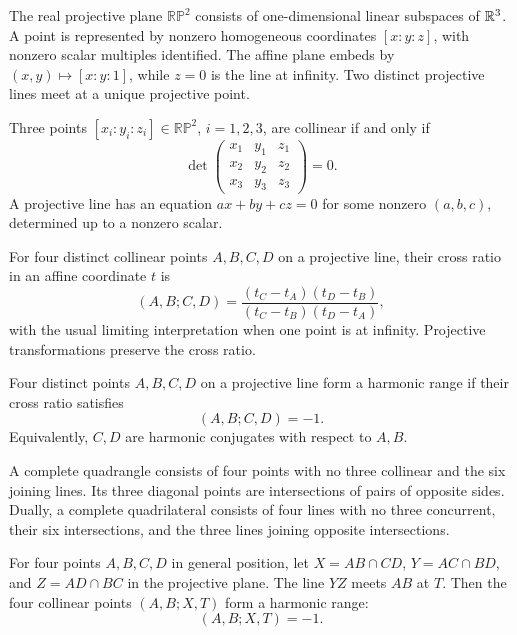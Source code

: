 \begin{definition}
The real projective plane $\mathbb{RP}^2$ consists of one-dimensional linear subspaces of $\mathbb{R}^3$. A point is represented by nonzero homogeneous coordinates $[x:y:z]$, with nonzero scalar multiples identified. The affine plane embeds by $(x,y)\mapsto[x:y:1]$, while $z=0$ is the line at infinity. Two distinct projective lines meet at a unique projective point.
\end{definition}
\begin{proposition}
Three points $[x_i:y_i:z_i]\in\mathbb{RP}^2$, $i=1,2,3$, are collinear if and only if
\[
 \det\begin{pmatrix}
 x_1&y_1&z_1\\ x_2&y_2&z_2\\ x_3&y_3&z_3
 \end{pmatrix}=0.
\]
A projective line has an equation $ax+by+cz=0$ for some nonzero $(a,b,c)$, determined up to a nonzero scalar.
\end{proposition}

\begin{definition}
For four distinct collinear points $A, B, C, D$ on a projective line, their cross ratio in an affine coordinate $t$ is
\[
 (A, B;C, D)=\frac{(t_C-t_A)(t_D-t_B)}{(t_C-t_B)(t_D-t_A)},
\]
with the usual limiting interpretation when one point is at infinity. Projective transformations preserve the cross ratio.
\end{definition}

\begin{definition}
Four distinct points $A,B,C,D$ on a projective line form a harmonic range if their cross ratio satisfies
\[
 (A,B;C,D)=-1.
\]
Equivalently, $C,D$ are harmonic conjugates with respect to $A,B$.
\end{definition}

\begin{definition}
A complete quadrangle consists of four points with no three collinear and the six joining lines. Its three diagonal points are intersections of pairs of opposite sides. Dually, a complete quadrilateral consists of four lines with no three concurrent, their six intersections, and the three lines joining opposite intersections.
\end{definition}

\begin{theorem}
For four points $A,B,C,D$ in general position, let $X=AB\cap CD$, $Y=AC\cap BD$, and $Z=AD\cap BC$ in the projective plane. The line $YZ$ meets $AB$ at $T$. Then the four collinear points $(A,B;X,T)$ form a harmonic range:
\[
 (A,B;X,T)=-1.
\]
\end{theorem}

